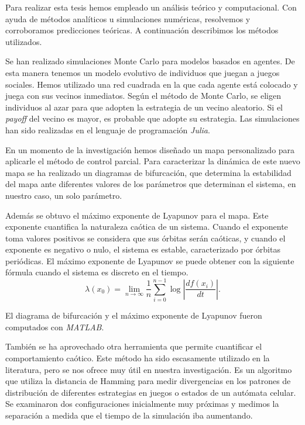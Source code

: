 Para realizar esta tesis hemos empleado un análisis teórico y computacional. Con ayuda de métodos analíticos u simulaciones numéricas, resolvemos y corroboramos predicciones teóricas. A continuación describimos los métodos utilizados.


Se han realizado simulaciones Monte Carlo para modelos basados en agentes. De esta manera tenemos un modelo evolutivo de individuos que juegan a juegos sociales. Hemos utilizado una red cuadrada en la que cada agente está colocado y juega con sus vecinos inmediatos. Según el método de Monte Carlo, se eligen individuos al azar para que adopten la estrategia de un vecino aleatorio. Si el \textit{payoff} del vecino es mayor, es probable que adopte su estrategia. Las simulaciones han sido realizadas en el lenguaje de programación \textit{Julia}.

En un momento de la investigación hemos diseñado un mapa personalizado para aplicarle el método de control parcial. Para caracterizar la dinámica de este nuevo mapa se ha realizado un diagramas de bifurcación, que determina la estabilidad del mapa ante diferentes valores de los parámetros que determinan el sistema, en nuestro caso, un solo parámetro. 

Además se obtuvo el máximo exponente de Lyapunov para el mapa. Este exponente cuantifica la naturaleza caótica de un sistema. Cuando el exponente toma valores positivos se considera que sus órbitas serán caóticas, y cuando el exponente es negativo o nulo, el sistema es estable, caracterizado por órbitas periódicas. El máximo exponente de Lyapunov se puede obtener con la siguiente fórmula cuando el sistema es discreto en el tiempo.
\begin{equation*}
\lambda(x_0) = \lim_{n \to \infty}\dfrac{1}{n}\sum_{i=0}^{n-1}\log\left|\dfrac{df(x_i)}{dt}\right|.
\end{equation*}

El diagrama de bifurcación y el máximo exponente de Lyapunov fueron computados con \textit{MATLAB}.

También se ha aprovechado otra herramienta que permite cuantificar el comportamiento caótico. Este método ha sido escasamente utilizado en la literatura, pero se nos ofrece muy útil en nuestra investigación. Es un algoritmo que utiliza la distancia de Hamming para medir divergencias en los patrones de distribución de diferentes estrategias en juegos o estados de un autómata celular. Se examinaron dos configuraciones inicialmente muy próximas y medimos la separación a medida que el tiempo de la simulación iba aumentando. 


